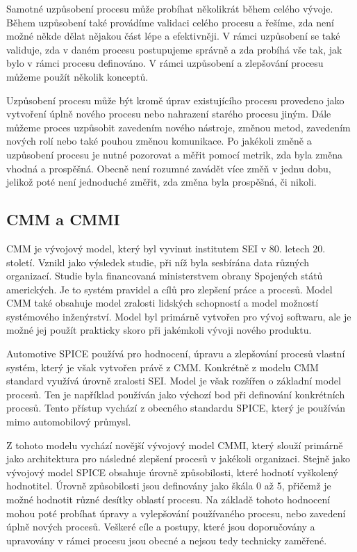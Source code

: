 \documentclass[czech,master]{diploma}
\begin{document}
Samotné uzpůsobení procesu může probíhat několikrát během celého vývoje. Během uzpůsobení také provádíme validaci celého procesu a řešíme, zda není možné někde dělat nějakou část lépe a efektivněji. V rámci uzpůsobení se také validuje, zda v daném procesu postupujeme správně a zda probíhá vše tak, jak bylo v rámci procesu definováno. V rámci uzpůsobení a zlepšování procesu můžeme použít několik konceptů.

Uzpůsobení procesu může být kromě úprav existujícího procesu provedeno jako vytvoření úplně nového procesu nebo nahrazení starého procesu jiným. Dále můžeme proces uzpůsobit zavedením nového nástroje, změnou metod, zavedením nových rolí nebo také pouhou změnou komunikace. Po jakékoli změně a uzpůsobení procesu je nutné pozorovat a měřit pomocí metrik, zda byla změna vhodná a prospěšná. Obecně není rozumné zavádět více změň v jednu dobu, jelikož poté není jednoduché změřit, zda změna byla prospěšná, či nikoli.

\subsection{CMM a CMMI}
CMM je vývojový model, který byl vyvinut institutem SEI v 80. letech 20. století. Vznikl jako výsledek studie, při níž byla sesbírána data různých organizací. Studie byla financovaná ministerstvem obrany Spojených států amerických. Je to systém pravidel a cílů pro zlepšení práce a procesů. Model CMM také obsahuje model zralosti lidských schopností a model možností systémového inženýrství. Model byl primárně vytvořen pro vývoj softwaru, ale je možné jej použít prakticky skoro při jakémkoli vývoji nového produktu. \cite{ref:cmm_cmmi}

Automotive SPICE používá pro hodnocení, úpravu a zlepšování procesů vlastní systém, který je však vytvořen právě z CMM. Konkrétně z modelu CMM standard využívá úrovně zralosti SEI. Model je však rozšířen o základní model procesů. Ten je například používán jako výchozí bod při definování konkrétních procesů. Tento přístup vychází z obecného standardu SPICE, který je používán mimo automobilový průmysl.

Z tohoto modelu vychází novější vývojový model CMMI, který slouží primárně jako architektura pro následné zlepšení procesů v jakékoli organizaci. Stejně jako vývojový model SPICE obsahuje úrovně způsobilosti, které hodnotí vyškolený hodnotitel. Úrovně způsobilosti jsou definovány jako škála 0 až 5, přičemž je možné hodnotit různé desítky oblastí procesu. Na základě tohoto hodnocení mohou poté probíhat úpravy a vylepšování používaného procesu, nebo zavedení úplně nových procesů. Veškeré cíle a postupy, které jsou doporučovány a upravovány v rámci procesu jsou obecné a nejsou tedy technicky zaměřené.
\end{document}
